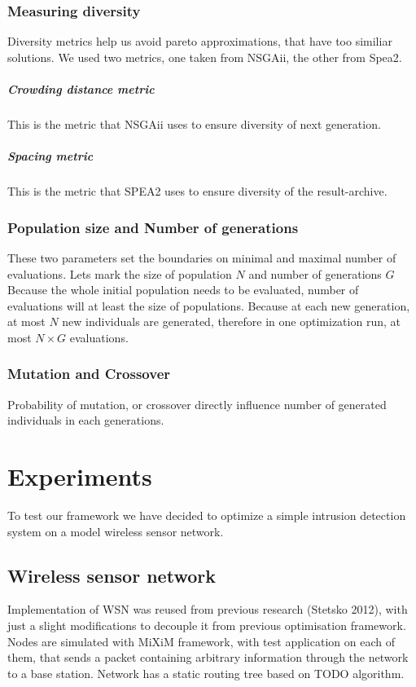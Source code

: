 \documentclass[12pt,oneside,draft]{fithesis2}
\begin{document}
\subsection{Measuring diversity}
Diversity metrics help us avoid pareto approximations, that have too similiar solutions. We used two metrics, one taken from NSGAii, the other from Spea2.

\paragraph{Crowding distance metric}
This is the metric that NSGAii uses to ensure diversity of next generation.

\paragraph{Spacing metric}
This is the metric that SPEA2 uses to ensure diversity of the result-archive. 

\subsection{Population size and Number of generations}
These two parameters set the boundaries on minimal and maximal number of evaluations. Lets mark the size of population $N$ and number of generations $G$ Because the whole initial population needs to be evaluated, number of evaluations will at least the size of populations.
Because at each new generation, at most $N$ new individuals are generated, therefore in one optimization run, at most $N \times G$ evaluations.

\subsection{Mutation and Crossover}
Probability of mutation, or crossover directly influence number of generated individuals in each generations.


\chapter{Experiments}
To test our framework we have decided to optimize a simple intrusion detection system on a model wireless sensor network.

\section{Wireless sensor network}
Implementation of WSN was reused from previous research (Stetsko 2012), with just a slight modifications to decouple it from previous optimisation framework. Nodes are simulated with MiXiM framework, with test application on each of them, that sends a packet containing arbitrary information through the network to a base station. Network has a static routing tree based on TODO algorithm. 
\end{document}
